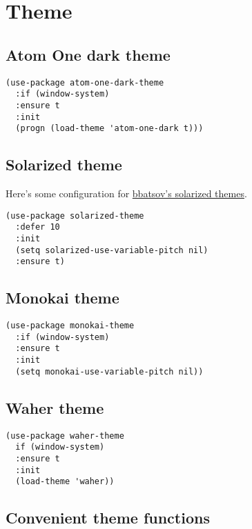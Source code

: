 \documentclass[11pt]{article}
\begin{document}
\section{Theme}
\label{sec-4}
\subsection{Atom One dark theme}
\label{sec-4-1}

\begin{verbatim}
(use-package atom-one-dark-theme
  :if (window-system)
  :ensure t
  :init 
  (progn (load-theme 'atom-one-dark t)))
\end{verbatim}

\subsection{Solarized theme}
\label{sec-4-2}

Here's some configuration for \href{https://github.com/bbatsov/solarized-emacs/}{bbatsov's solarized themes}.

\begin{verbatim}
(use-package solarized-theme
  :defer 10
  :init
  (setq solarized-use-variable-pitch nil)
  :ensure t)
\end{verbatim}

\subsection{Monokai theme}
\label{sec-4-3}

\begin{verbatim}
(use-package monokai-theme
  :if (window-system)
  :ensure t
  :init
  (setq monokai-use-variable-pitch nil))
\end{verbatim}

\subsection{Waher theme}
\label{sec-4-4}

\begin{verbatim}
(use-package waher-theme
  if (window-system)
  :ensure t
  :init
  (load-theme 'waher))
\end{verbatim}

\subsection{Convenient theme functions}
\label{sec-4-5}
\end{document}
